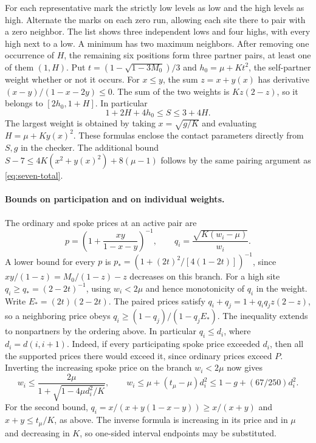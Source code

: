 \documentclass[11pt,a4paper]{article}
\theoremstyle{definition}
\begin{document}
For each representative mark the strictly low levels as low and the high
levels as high. Alternate the marks on each zero run, allowing each site
there to pair with a zero neighbor. The list shows three independent lows
and four highs, with every high next to a low. A minimum has two maximum
neighbors. After removing one occurrence of $H$, the remaining six
positions form three partner pairs, at least one of them $(1,H)$.
Put $t=(1-\sqrt{1-3M_0})/3$ and $h_0=\mu+Kt^2$, the self-partner
weight whether or not it occurs. For $x\le y$, the sum $z=x+y(x)$ has
derivative $(x-y)/(1-x-2y)\le0$. The sum of the two weights is
$Kz(2-z)$, so it belongs to $[2h_0,1+H]$. In particular
\begin{equation}\label{eq:seven-pairsum}
             1+2H+4h_0\le S\le3+4H .
\end{equation}
The largest weight is obtained by taking $x=\sqrt{g/K}$ and evaluating
$H=\mu+K y(x)^2$. These formulas enclose the contact parameters directly
from $S,g$ in the checker. The additional bound
$S-7\le4K(x^2+y(x)^2)+8(\mu-1)$ follows by the same pairing argument
as \eqref{eq:seven-total}.

\paragraph{Bounds on participation and on individual weights.}
The ordinary and spoke prices at an active pair are
\[
 p=\left(1+\frac{xy}{1-x-y}\right)^{-1},\qquad
 q_i=\frac{\sqrt{K(w_i-\mu)}}{w_i}.
\]
A lower bound for every $p$ is
$p_*=(1+(2t)^2/[4(1-2t)])^{-1}$, since
$xy/(1-z)=M_0/(1-z)-z$ decreases on this branch. For a high site
$q_i\ge q_*=(2-2t)^{-1}$, using $w_i<2\mu$ and hence monotonicity of
$q_i$ in the weight. Write $E_*=(2t)(2-2t)$. The paired prices satisfy
$q_i+q_j=1+q_iq_jz(2-z)$, so a neighboring price obeys
$q_i\ge(1-q_j)/(1-q_jE_*)$. The inequality extends to nonpartners by
the ordering above. In particular $q_i\le d_i$, where $d_i=d(i,i+1)$. Indeed, if every participating spoke price exceeded $d_i$, then all the supported
prices there would exceed it, since ordinary prices exceed $P$. Inverting
the increasing spoke price on the branch $w_i<2\mu$ now gives
\[
 w_i\le\frac{2\mu}{1+\sqrt{1-4\mu d_i^2/K}},\qquad
 w_i\le\mu+(t_\mu-\mu)d_i^2\le1-g+(67/250)d_i^2 .
\]
For the second bound, $q_i=x/(x+y(1-x-y))\ge x/(x+y)$ and
$x+y\le t_\mu/K$, as above. The inverse formula is increasing in its
price and in $\mu$ and decreasing in $K$, so one-sided interval
endpoints may be substituted.
\end{document}
